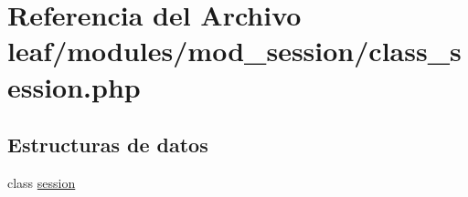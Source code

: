 \hypertarget{class__session_8php}{\section{Referencia del Archivo leaf/modules/mod\-\_\-session/class\-\_\-session.php}
\label{class__session_8php}
}
\subsection*{Estructuras de datos}
\begin{DoxyCompactItemize}
\item 
class \hyperlink{classsession}{session}
\end{DoxyCompactItemize}
